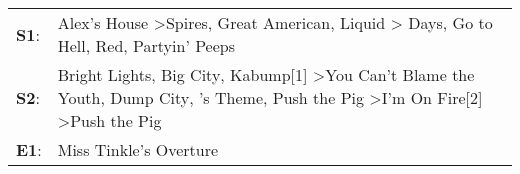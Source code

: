 \begin{supertabular}{p{0.03\textwidth}p{0.92\textwidth}}
 \textbf{S1}:  &                                                        Alex's House\textsuperscript{} \textgreater \enspace Spires\textsuperscript{}, \enspace Great American\textsuperscript{}, \enspace Liquid\textsuperscript{} \textgreater {} Days\textsuperscript{}, \enspace Go to Hell\textsuperscript{}, \enspace Red\textsuperscript{}, \enspace Partyin' Peeps\textsuperscript{}  \enspace  \\
 \textbf{S2}:  &  Bright Lights, Big City\textsuperscript{}, \enspace Kabump[1]\textsuperscript{} \textgreater \enspace You Can't Blame the Youth\textsuperscript{}, \enspace Dump City\textsuperscript{}, 's Theme\textsuperscript{}, \enspace Push the Pig\textsuperscript{} \textgreater \enspace I'm On Fire[2]\textsuperscript{} \textgreater \enspace Push the Pig\textsuperscript{}  \enspace  \\
 \textbf{E1}:  &                                                                                                                                                                                                                                                                                                                                             Miss Tinkle's Overture\textsuperscript{}  \enspace  \\
\end{supertabular}
